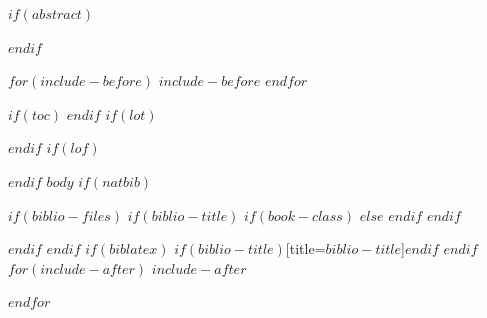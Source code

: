 \documentclass[$if(fontsize)$$fontsize$,$endif$$if(lang)$$lang$,$endif$$if(papersize)$$papersize$,$endif$$for(classoption)$$classoption$$sep$,$endfor$]{$documentclass$}
\begin{document}
	\restoregeometry
	
	$if(abstract)$
	\begin{abstract}
		$abstract$
	\end{abstract}
	$endif$
	
	$for(include-before)$
	$include-before$
	$endfor$
	
	$if(toc)$
	{
		\hypersetup{linkcolor=black}
		\setcounter{tocdepth}{$toc-depth$}
		\tableofcontents
	}
	$endif$
	$if(lot)$
	\newpage
	\listoftables
	$endif$
	$if(lof)$
	\newpage
	\listoffigures
	$endif$
	\newpage
	$body$
	$if(natbib)$
	
	$if(biblio-files)$
	$if(biblio-title)$
	$if(book-class)$
	\renewcommand\bibname{$biblio-title$}
	$else$
	\renewcommand\refname{$biblio-title$}
	$endif$
	$endif$
	
	
	$endif$
	$endif$
	$if(biblatex)$
	\renewcommand*{\mkbibnamefamily}[1]{\textbf{#1}}
	\renewcommand*{\mkbibnamegiven}[1]{\textbf{#1}}
	\renewcommand*{\mkbibnameprefix}[1]{\textbf{#1}}
	\renewcommand*{\mkbibnamesuffix}[1]{\textbf{#1}}
	\printbibliography$if(biblio-title)$[title=$biblio-title$]$endif$
	$endif$
	$for(include-after)$
	$include-after$
	
	$endfor$
\end{document}
